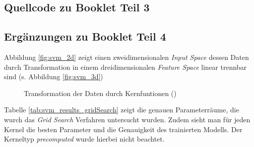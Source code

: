\subsection{Quellcode zu Booklet Teil 3}

\pagebreak
\subsection{Ergänzungen zu Booklet Teil 4}\label{app:svm_ergaenzungen}
Abbildung \ref{fig:svm_2d} zeigt einen zweidimensionalen \emph{Input Space} dessen Daten durch Transformation in einem dreidimensionalen \emph{Feature Space} linear trennbar sind (s. Abbildung \ref{fig:svm_3d})\\
\begin{figure}[h]
	\centering
	\hfill
	\caption{Transformation der Daten durch Kernfuntionen (\cite{2018_mello_ponti})}
\end{figure}
Tabelle \ref{tab:svm_results_gridSearch} zeigt die genauen Parameterräume, die wurch das \emph{Grid Search} Verfahren untersucht wurden. Zudem sieht man für jeden Kernel die besten Parameter und die Genauigkeit des trainierten Modells. Der Kerneltyp \emph{precomputed} wurde hierbei nicht beachtet.
